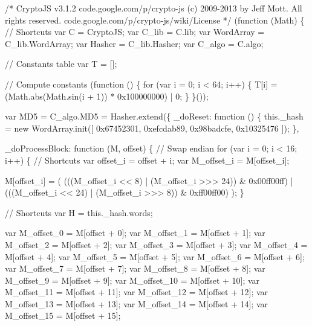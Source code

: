 \begin{DoxyCodeInclude}
\textcolor{comment}{/*}
\textcolor{comment}{CryptoJS v3.1.2}
\textcolor{comment}{code.google.com/p/crypto-js}
\textcolor{comment}{(c) 2009-2013 by Jeff Mott. All rights reserved.}
\textcolor{comment}{code.google.com/p/crypto-js/wiki/License}
\textcolor{comment}{*/}
(\textcolor{keyword}{function} (Math) \{
    \textcolor{comment}{// Shortcuts}
    var C = CryptoJS;
    var C\_lib = C.lib;
    var WordArray = C\_lib.WordArray;
    var Hasher = C\_lib.Hasher;
    var C\_algo = C.algo;

    \textcolor{comment}{// Constants table}
    var T = [];

    \textcolor{comment}{// Compute constants}
    (\textcolor{keyword}{function} () \{
        \textcolor{keywordflow}{for} (var i = 0; i < 64; i++) \{
            T[i] = (Math.abs(Math.sin(i + 1)) * 0x100000000) | 0;
        \}
    \}());

    var MD5 = C\_algo.MD5 = Hasher.extend(\{
        \_doReset: \textcolor{keyword}{function} () \{
            this.\_hash = \textcolor{keyword}{new} WordArray.init([
                0x67452301, 0xefcdab89,
                0x98badcfe, 0x10325476
            ]);
        \},

        \_doProcessBlock: \textcolor{keyword}{function} (M, offset) \{
            \textcolor{comment}{// Swap endian}
            \textcolor{keywordflow}{for} (var i = 0; i < 16; i++) \{
                \textcolor{comment}{// Shortcuts}
                var offset\_i = offset + i;
                var M\_offset\_i = M[offset\_i];

                M[offset\_i] = (
                    (((M\_offset\_i << 8)  | (M\_offset\_i >>> 24)) & 0x00ff00ff) |
                    (((M\_offset\_i << 24) | (M\_offset\_i >>> 8))  & 0xff00ff00)
                );
            \}

            \textcolor{comment}{// Shortcuts}
            var H = this.\_hash.words;

            var M\_offset\_0  = M[offset + 0];
            var M\_offset\_1  = M[offset + 1];
            var M\_offset\_2  = M[offset + 2];
            var M\_offset\_3  = M[offset + 3];
            var M\_offset\_4  = M[offset + 4];
            var M\_offset\_5  = M[offset + 5];
            var M\_offset\_6  = M[offset + 6];
            var M\_offset\_7  = M[offset + 7];
            var M\_offset\_8  = M[offset + 8];
            var M\_offset\_9  = M[offset + 9];
            var M\_offset\_10 = M[offset + 10];
            var M\_offset\_11 = M[offset + 11];
            var M\_offset\_12 = M[offset + 12];
            var M\_offset\_13 = M[offset + 13];
            var M\_offset\_14 = M[offset + 14];
            var M\_offset\_15 = M[offset + 15];


\end{DoxyCodeInclude}
